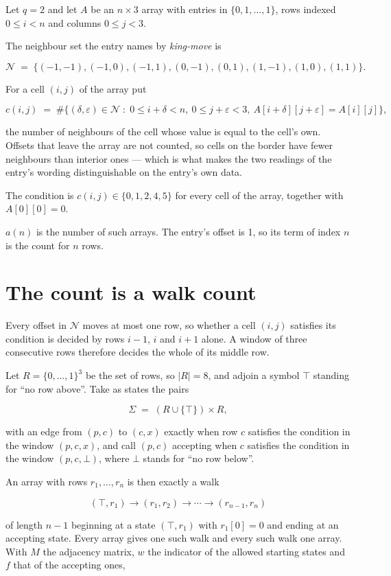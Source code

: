 \documentclass[11pt]{article}
\theoremstyle{definition}
\begin{document}
Let $q = 2$ and let $A$ be an $n \times 3$ array with entries in $\{0,1,\dots,1\}$, rows indexed $0 \le i < n$ and columns $0 \le j < 3$.

The neighbour set the entry names by {\itshape king-move} is

\[\mathcal{N} \;=\; \{(-1,-1), (-1,0), (-1,1), (0,-1), (0,1), (1,-1), (1,0), (1,1)\}.\]

For a cell $(i,j)$ of the array put

\[c(i,j) \;=\; \#\bigl\{(\delta,\varepsilon)\in\mathcal{N} \;:\; 0\le i+\delta<n,\ 0\le j+\varepsilon<3,\ A[i+\delta][j+\varepsilon] = A[i][j]\bigr\},\]

the number of neighbours of the cell whose value is equal to the cell's own. Offsets that leave the array are not counted, so cells on the border have fewer neighbours than interior ones --- which is what makes the two readings of the entry's wording distinguishable on the entry's own data.

The condition is $c(i,j) \in \{0, 1, 2, 4, 5\}$ for every cell of the array, together with $A[0][0]=0$.

$a(n)$ is the number of such arrays. The entry's offset is 1, so its term of index $n$ is the count for $n$ rows.

\section{The count is a walk count}

Every offset in $\mathcal{N}$ moves at most one row, so whether a cell $(i,j)$ satisfies its condition is decided by rows $i-1$, $i$ and $i+1$ alone. A window of three consecutive rows therefore decides the whole of its middle row.

Let $R = \{0,\dots,1\}^{3}$ be the set of rows, so $|R| = 8$, and adjoin a symbol $\top$ standing for ``no row above''. Take as states the pairs

\[\Sigma \;=\; (R \cup \{\top\}) \times R,\]

with an edge from $(p,c)$ to $(c,x)$ exactly when row $c$ satisfies the condition in the window $(p,c,x)$, and call $(p,c)$ accepting when $c$ satisfies the condition in the window $(p,c,\bot)$, where $\bot$ stands for ``no row below''.

An array with rows $r_1,\dots,r_n$ is then exactly a walk

\[(\top,r_1) \to (r_1,r_2) \to \cdots \to (r_{n-1},r_n)\]

of length $n-1$ beginning at a state $(\top,r_1)$ with $r_1[0]=0$ and ending at an accepting state. Every array gives one such walk and every such walk one array. With $M$ the adjacency matrix, $w$ the indicator of the allowed starting states and $f$ that of the accepting ones,
\end{document}
